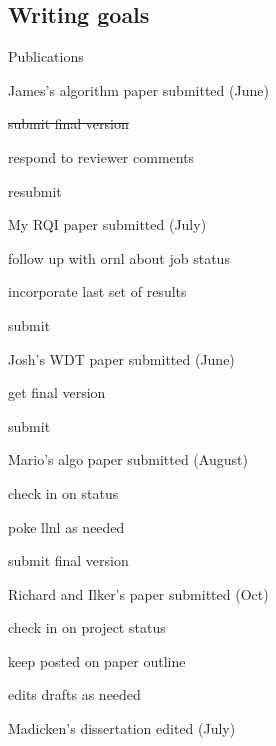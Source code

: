 \documentclass[12pt,twoside]{article}
\begin{document}
\subsection{Writing goals}
\begin{compactitem}
\item Publications
  \begin{compactitem}
  \item James's algorithm paper submitted (June)
     \begin{compactitem}
     \item \st{submit final version}
     \item respond to reviewer comments
     \item resubmit
     \end{compactitem}
  \item My RQI paper submitted (July)
     \begin{compactitem}
     \item follow up with ornl about job status
     \item incorporate last set of results
     \item submit
     \end{compactitem}
  \item Josh's WDT paper submitted (June)
     \begin{compactitem}
     \item get final version
     \item submit
     \end{compactitem}
  \item Mario's algo paper submitted (August)
     \begin{compactitem}
     \item check in on status
     \item poke llnl as needed
     \item submit final version
     \end{compactitem}
  \item Richard and Ilker's paper submitted (Oct)
     \begin{compactitem}
     \item check in on project status
     \item keep posted on paper outline
     \item edits drafts as needed
     \end{compactitem}
  \item Madicken's dissertation edited (July)
     \begin{compactitem}

\end{compactitem}
\end{compactitem}
\end{compactitem}
\end{document}
